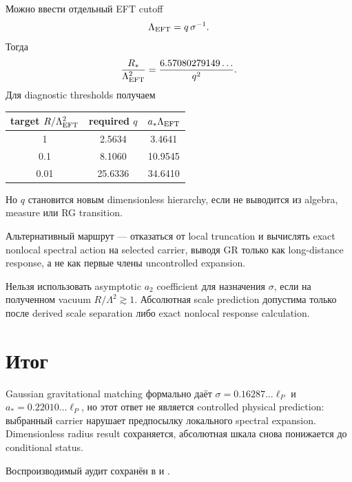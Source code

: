 Можно ввести отдельный EFT cutoff
\begin{equation}
 \Lambda_{\rm EFT}=q\,\sigma^{-1}.
\end{equation}
Тогда
\begin{equation}
 \frac{R_*}{\Lambda_{\rm EFT}^2}
 =\frac{6.57080279149\ldots}{q^2}.
\end{equation}
Для diagnostic thresholds получаем
\begin{center}
\begin{tabular}{ccc}
\toprule
target \(R/\Lambda_{\rm EFT}^2\) & required \(q\) &
\(a_*\Lambda_{\rm EFT}\) \\
\midrule
1 & 2.5634 & 3.4641 \\
0.1 & 8.1060 & 10.9545 \\
0.01 & 25.6336 & 34.6410 \\
\bottomrule
\end{tabular}
\end{center}
Но \(q\) становится новым dimensionless hierarchy, если не выводится из
algebra, measure или RG transition.

Альтернативный маршрут --- отказаться от local truncation и вычислять exact
nonlocal spectral action на selected carrier, выводя GR только как
long-distance response, а не как первые члены uncontrolled expansion.

\begin{nogocriterion}
Нельзя использовать asymptotic \(a_2\) coefficient для назначения
\(\sigma\), если на полученном vacuum \(R/\Lambda^2\gtrsim1\). Абсолютная
scale prediction допустима только после derived scale separation либо exact
nonlocal response calculation.
\end{nogocriterion}

\section{Итог}

\begin{theorem}
Gaussian gravitational matching формально даёт
\(\sigma=0.16287\ldots\ell_P\) и
\(a_*=0.22010\ldots\ell_P\), но этот ответ не является controlled physical
prediction: выбранный carrier нарушает предпосылку локального spectral
expansion. Dimensionless radius result сохраняется, абсолютная шкала снова
понижается до conditional status.
\end{theorem}

Воспроизводимый аудит сохранён в
 и
.